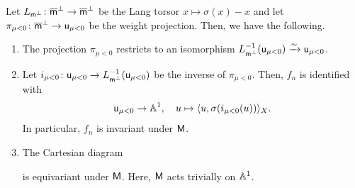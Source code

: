 \documentclass[12pt,reqno]{amsart}
\begin{document}
\begin{lem} \label{lem:M_action_on_W(n)_odd}
    Let $L_{{\mathsf{m}}^\perp} \colon {\mathsf{{\overline{m}}}}^\perp \to {\mathsf{{\overline{m}}}}^\perp$ be the Lang torsor $x \mapsto \sigma(x) - x$ and let $\pi_{\mu < 0}\colon {\mathsf{{\overline{m}}}}^\perp \to {\mathsf{u}}_{\mu < 0}$ be the weight projection. Then, we have the following. 
    \begin{enumerate}
        \item The projection $\pi_{\mu < 0}$ restricts to an isomorphism $L_{{\mathsf{m}}^\perp}^{-1}({\mathsf{u}}_{\mu < 0}) \xrightarrow{\sim} {\mathsf{u}}_{\mu < 0}$. 
        \item Let $i_{\mu < 0} \colon {\mathsf{u}}_{\mu < 0} \to L_{{\mathsf{m}}^\perp}^{-1}({\mathsf{u}}_{\mu < 0})$ be the inverse of $\pi_{\mu < 0}$. Then, $f_n$ is identified with 
        \[
            {\mathsf{u}}_{\mu < 0} \to \mathbb{A}^1 ,\quad 
            u \mapsto \langle u, \sigma(i_{\mu < 0}(u)) \rangle_X. 
        \]
        In particular, $f_n$ is invariant under ${\mathsf{M}}$. 
        \item The Cartesian diagram
        \begin{center}
        \end{center}
        is equivariant under ${\mathsf{M}}$. Here, ${\mathsf{M}}$ acts trivially on $\mathbb{A}^1$. 
    \end{enumerate}
\end{lem}
\end{document}
